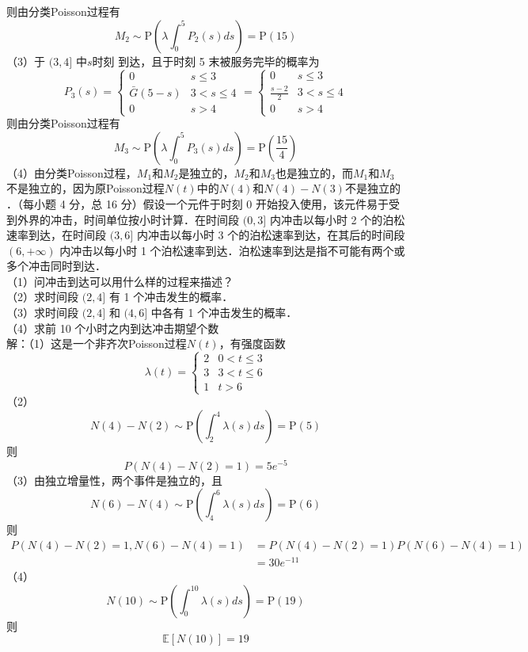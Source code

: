 \documentclass[UTF8]{ctexart}
\begin{document}
则由分类Poisson过程有
\[
M_2 \sim \mathrm{P}\left(\lambda \int_{0}^{5} P_2(s)ds  \right) =\mathrm{P}(15)
\]
（3）于 $(3,4]$ 中$s$时刻 到达，且于时刻 5 末被服务完毕的概率为
\[
P_3(s)=
\begin{cases}
	0  &  s\le 3 \\
	\bar{G}(5-s)  &  3<s\le 4\\
	0 & s>4
\end{cases}
=
\begin{cases}
	0  &  s\le 3 \\
	\frac{s-2}{2}  &  3<s\le 4\\
	0 & s>4
\end{cases}
\]
则由分类Poisson过程有
\[
M_3 \sim \mathrm{P}\left(\lambda \int_{0}^{5} P_3(s)ds  \right) =\mathrm{P}\left(\frac{15}{4} \right) 
\]
（4）由分类Poisson过程，$M_1$和$M_2$是独立的，$M_2$和$M_3$也是独立的，而$M_1$和$M_3$不是独立的，因为原Poisson过程$N(t)$中的$N(4)$和$N(4)-N(3)$不是独立的\\





．（每小题 4 分，总 16 分）假设一个元件于时刻 0 开始投入使用，该元件易于受到外界的冲击，时间单位按小时计算．在时间段 $(0,3]$ 内冲击以每小时 2 个的泊松速率到达，在时间段 $(3,6]$ 内冲击以每小时 3 个的泊松速率到达，在其后的时间段 $(6,+\infty)$ 内冲击以每小时 1 个泊松速率到达．泊松速率到达是指不可能有两个或多个冲击同时到达．\\
（1）问冲击到达可以用什么样的过程来描述？\\
（2）求时间段 $(2,4]$ 有 1 个冲击发生的概率．\\
（3）求时间段 $(2,4]$ 和 $(4,6]$ 中各有 1 个冲击发生的概率．\\
（4）求前 10 个小时之内到达冲击期望个数\\
解：（1）这是一个非齐次Poisson过程$N(t)$，有强度函数
\[
\lambda(t)=
\begin{cases}
	2  &  0<t\le 3 \\
	3  &  3<t\le 6 \\
	1  &  t>6
\end{cases}
\]
（2）
\[
N(4)-N(2)\sim \mathrm{P}\left(\int_{2}^{4}\lambda(s)ds \right)=\mathrm{P}(5) 
\]
则
\[
P(N(4)-N(2)=1)=5e^{-5}
\]
（3）由独立增量性，两个事件是独立的，且
\[
N(6)-N(4)\sim \mathrm{P}\left(\int_{4}^{6}\lambda(s)ds \right)=\mathrm{P}(6) 
\]
则
\begin{align*}
	P(N(4)-N(2)=1,N(6)-N(4)=1) &= P(N(4)-N(2)=1) P(N(6)-N(4)=1)\\
	& =30e^{-11}
\end{align*}
（4）
\[
N(10)\sim \mathrm{P}\left(\int_{0}^{10}\lambda(s)ds \right)=\mathrm{P}(19) 
\]
则
\[
\mathbb{E}[N(10)]=19
\]\\
\end{document}
